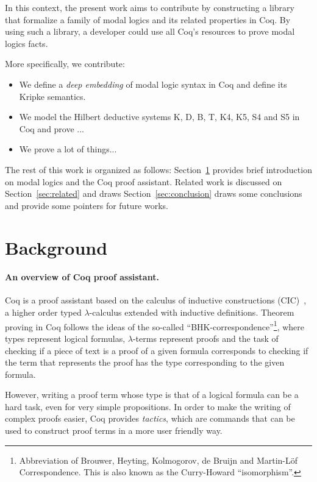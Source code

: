 \documentclass[sigconf]{acmart}
\begin{document}
In this context, the present work aims to contribute by constructing a library
that formalize a family of modal logics and its related properties in Coq.
By using such a library, a developer could use all Coq's resources to prove
modal logics facts.

More specifically, we contribute:

\begin{itemize}
  \item We define a \emph{deep embedding} of modal logic syntax in Coq and
    define its Kripke semantics.
  \item We model the Hilbert deductive systems K, D, B, T, K4, K5, S4 and S5
    in Coq and prove ...
  \item We prove a lot of things... 
\end{itemize}

The rest of this work is organized as follows: Section~\ref{sec:background} provides
brief introduction on modal logics and the Coq proof assistant. Related work is discussed
on Section~\ref{sec:related} and draws Section~\ref{sec:conclusion} draws some conclusions and
provide some pointers for future works.

\section{Background}\label{sec:background}

\paragraph{An overview of Coq proof assistant.}

Coq is a proof assistant based on the calculus of inductive
constructions (CIC)~\cite{manual_cic}, a higher order typed
$\lambda$-calculus extended with inductive definitions.  Theorem
proving in Coq follows the ideas of the so-called
``BHK-cor\-res\-pon\-dence''\footnote{Abbreviation of Brouwer, Heyting,
  Kolmogorov, de Bruijn and Martin-L\"of Correspondence. This is also
  known as the Curry-Howard ``isomorphism''.}, where types represent
logical formulas, $\lambda$-terms represent proofs
\cite{Bertot10} and the task of checking if a piece of text is a
proof of a given formula corresponds to checking if the term that
represents the proof has the type corresponding to the given formula.

However, writing a proof term whose type is that of a logical formula
can be a hard task, even for very simple propositions.  In order to
make the writing of complex proofs easier, Coq provides
\emph{tactics}, which are commands that can be used to construct proof
terms in a more user friendly way.
\end{document}

